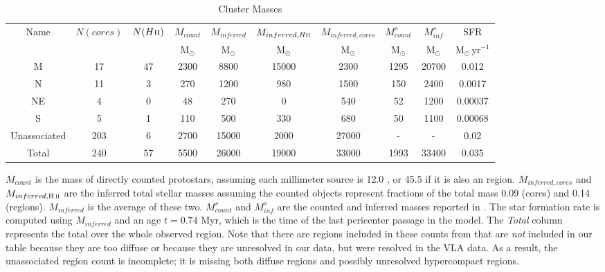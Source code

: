 \begin{table*}[htp]
\centering
\caption{Cluster Masses}
\begin{tabular}{cccccccccc}
\label{tab:clustermassestimates}
Name & $N(cores)$ & $N(H\textsc{ii})$ & $M_{count}$ & $M_{inferred}$ & $M_{inferred, H\textsc{ii}}$ & $M_{inferred, cores}$ & $M_{count}^s$ & $M_{inf}^s$ & SFR \\
 &  &  & $\mathrm{M_{\odot}}$ & $\mathrm{M_{\odot}}$ & $\mathrm{M_{\odot}}$ & $\mathrm{M_{\odot}}$ & $\mathrm{M_{\odot}}$ & $\mathrm{M_{\odot}}$ & $\mathrm{M_{\odot}\,yr^{-1}}$ \\
\hline
M & 17 & 47 & 2300 & 8800 & 15000 & 2300 & 1295 & 20700 & 0.012 \\
N & 11 & 3 & 270 & 1200 & 980 & 1500 & 150 & 2400 & 0.0017 \\
NE & 4 & 0 & 48 & 270 & 0 & 540 & 52 & 1200 & 0.00037 \\
S & 5 & 1 & 110 & 500 & 330 & 680 & 50 & 1100 & 0.00068 \\
Unassociated & 203 & 6 & 2700 & 15000 & 2000 & 27000 & - & - & 0.02 \\
Total & 240 & 57 & 5500 & 26000 & 19000 & 33000 & 1993 & 33400 & 0.035 \\
\hline
\end{tabular}
\par
$M_{count}$ is the mass of directly counted protostars, assuming each millimeter source is 12.0 \msun, or 45.5 \msun if it is also an \hii region.  $M_{inferred,cores}$ and $M_{inferred,\hii}$ are the inferred total stellar masses assuming the counted objects represent fractions of the total mass 0.09 (cores) and 0.14 (\hii regions).  $M_{inferred}$ is the average of these two.  $M_{count}^s$ and $M_{inf}^s$ are the counted and inferred masses reported in \citet{Schmiedeke2016a}.  The star formation rate is computed using $M_{inferred}$ and an age $t=0.74$ Myr, which is the time of the last pericenter passage in the \citet{Kruijssen2015a} model.  The \emph{Total} column represents the total over the whole observed region.  Note that there are \hii regions included in these counts from \citet{Schmiedeke2016a} that are \emph{not} included in our table because they are too diffuse or because they are unresolved in our data, but were resolved in the \citet{De-Pree2014a} VLA data.  As a result, the unassociated \hii region count is incomplete; it is missing both diffuse \hii regions and possibly unresolved hypercompact \hii regions.
\end{table*}
